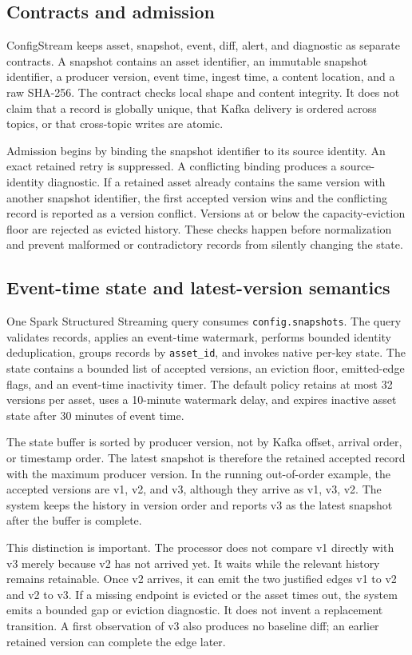 \documentclass[a4paper,11pt]{article}
\begin{document}
\subsection{Contracts and admission}
ConfigStream keeps asset, snapshot, event, diff, alert, and diagnostic as separate contracts. A snapshot contains an asset identifier, an immutable snapshot identifier, a producer version, event time, ingest time, a content location, and a raw SHA-256. The contract checks local shape and content integrity. It does not claim that a record is globally unique, that Kafka delivery is ordered across topics, or that cross-topic writes are atomic.

Admission begins by binding the snapshot identifier to its source identity. An exact retained retry is suppressed. A conflicting binding produces a source-identity diagnostic. If a retained asset already contains the same version with another snapshot identifier, the first accepted version wins and the conflicting record is reported as a version conflict. Versions at or below the capacity-eviction floor are rejected as evicted history. These checks happen before normalization and prevent malformed or contradictory records from silently changing the state.

\subsection{Event-time state and latest-version semantics}
One Spark Structured Streaming query consumes \texttt{config.snapshots}. The query validates records, applies an event-time watermark, performs bounded identity deduplication, groups records by \texttt{asset\_id}, and invokes native per-key state. The state contains a bounded list of accepted versions, an eviction floor, emitted-edge flags, and an event-time inactivity timer. The default policy retains at most 32 versions per asset, uses a 10-minute watermark delay, and expires inactive asset state after 30 minutes of event time.

The state buffer is sorted by producer version, not by Kafka offset, arrival order, or timestamp order. The latest snapshot is therefore the retained accepted record with the maximum producer version. In the running out-of-order example, the accepted versions are v1, v2, and v3, although they arrive as v1, v3, v2. The system keeps the history in version order and reports v3 as the latest snapshot after the buffer is complete.

This distinction is important. The processor does not compare v1 directly with v3 merely because v2 has not arrived yet. It waits while the relevant history remains retainable. Once v2 arrives, it can emit the two justified edges v1 to v2 and v2 to v3. If a missing endpoint is evicted or the asset times out, the system emits a bounded gap or eviction diagnostic. It does not invent a replacement transition. A first observation of v3 also produces no baseline diff; an earlier retained version can complete the edge later.
\end{document}
